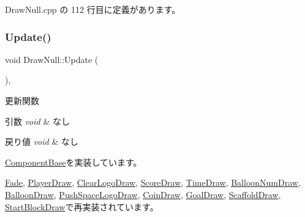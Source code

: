  Draw\+Null.\+cpp の 112 行目に定義があります。

\mbox{\label{class_draw_null_ad32a508d269de7eda8ad24ea72230464}} 
\subsubsection{\texorpdfstring{Update()}{Update()}}
{\footnotesize\ttfamily void Draw\+Null\+::\+Update (\begin{DoxyParamCaption}{ }\end{DoxyParamCaption})\hspace{0.3cm}{\ttfamily [override]}, {\ttfamily [virtual]}}



更新関数 


\begin{DoxyParams}{引数}
{\em void} & なし \\
\hline
\end{DoxyParams}

\begin{DoxyRetVals}{戻り値}
{\em void} & なし \\
\hline
\end{DoxyRetVals}


\mbox{\hyperlink{class_component_base_a58e66d65bc8f3cd5ab67b4b2deab4fc2}{Component\+Base}}を実装しています。



\mbox{\hyperlink{class_fade_a332851a9b9fc0b9e3bd0f536f9026004}{Fade}}, \mbox{\hyperlink{class_player_draw_aa16d0fb9345c08df3b3a626128707cf7}{Player\+Draw}}, \mbox{\hyperlink{class_clear_logo_draw_a2253a9252d9ba6e23602379404ec92fc}{Clear\+Logo\+Draw}}, \mbox{\hyperlink{class_score_draw_a84fa10dee56f75616d4643b3568daf61}{Score\+Draw}}, \mbox{\hyperlink{class_time_draw_a2471360fb021ce38bec34dbe6f171b9f}{Time\+Draw}}, \mbox{\hyperlink{class_balloon_num_draw_a448d1635bbf6457187d76818b8c0aa88}{Balloon\+Num\+Draw}}, \mbox{\hyperlink{class_balloon_draw_a9314af6e3458e87fcace44a11e33126f}{Balloon\+Draw}}, \mbox{\hyperlink{class_push_space_logo_draw_a75248e42d5b677c81169be478b59141f}{Push\+Space\+Logo\+Draw}}, \mbox{\hyperlink{class_coin_draw_a6157b17bf1706b85156aad0d88acfd7e}{Coin\+Draw}}, \mbox{\hyperlink{class_goal_draw_a6e003277ed44eb9c800a616b6acbcb20}{Goal\+Draw}}, \mbox{\hyperlink{class_scaffold_draw_a62c2bb223525c9ab3e9eff4c2705d377}{Scaffold\+Draw}}, \mbox{\hyperlink{class_start_block_draw_a845ce671ce8191a68ef4fc159c2f2a93}{Start\+Block\+Draw}}で再実装されています。



